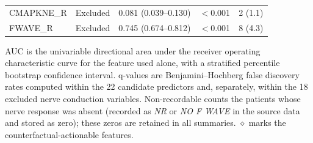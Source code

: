 \begin{table}[!ht]
\begin{tabular}{llccc}
CMAPKNE\_R & Excluded & 0.081 (0.039--0.130) & $<$0.001 & 2 (1.1) \\
FWAVE\_R & Excluded & 0.745 (0.674--0.812) & $<$0.001 & 8 (4.3) \\
\bottomrule
\end{tabular}
\begin{flushleft}\footnotesize AUC is the univariable directional area under the receiver operating characteristic curve for the feature used alone, with a stratified percentile bootstrap confidence interval. q-values are Benjamini--Hochberg false discovery rates computed within the 22 candidate predictors and, separately, within the 18 excluded nerve conduction variables. Non-recordable counts the patients whose nerve response was absent (recorded as \textit{NR} or \textit{NO F WAVE} in the source data and stored as zero); these zeros are retained in all summaries. $\diamond$ marks the counterfactual-actionable features.\end{flushleft}
\end{table}

